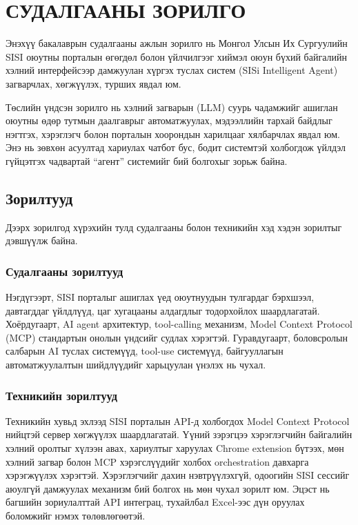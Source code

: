 \chapter{СУДАЛГААНЫ ЗОРИЛГО}

Энэхүү бакалаврын судалгааны ажлын зорилго нь Монгол Улсын Их Сургуулийн SISI оюутны порталын өгөгдөл болон үйлчилгээг хиймэл оюун бүхий байгалийн хэлний интерфейсээр дамжуулан хүргэх туслах систем (SISi Intelligent Agent) загварчлах, хөгжүүлэх, турших явдал юм.

Төслийн үндсэн зорилго нь хэлний загварын (LLM) суурь чадамжийг ашиглан оюутны өдөр тутмын даалгаврыг автоматжуулах, мэдээллийн тархай байдлыг нэгтгэх, хэрэглэгч болон порталын хоорондын харилцааг хялбарчлах явдал юм. Энэ нь зөвхөн асуултад хариулах чатбот бус, бодит системтэй холбогдож үйлдэл гүйцэтгэх чадвартай ``агент'' системийг бий болгохыг зорьж байна.

\section{Зорилтууд}

Дээрх зорилгод хүрэхийн тулд судалгааны болон техникийн хэд хэдэн зорилтыг дэвшүүлж байна.

\subsection{Судалгааны зорилтууд}

Нэгдүгээрт, SISI порталыг ашиглах үед оюутнуудын тулгардаг бэрхшээл, давтагддаг үйлдлүүд, цаг хугацааны алдагдлыг тодорхойлох шаардлагатай. Хоёрдугаарт, AI agent архитектур, tool-calling механизм, Model Context Protocol (MCP) стандартын онолын үндсийг судлах хэрэгтэй. Гуравдугаарт, боловсролын салбарын AI туслах системүүд, tool-use системүүд, байгууллагын автоматжуулалтын шийдлүүдийг харьцуулан үнэлэх нь чухал.

\subsection{Техникийн зорилтууд}

Техникийн хувьд эхлээд SISI порталын API-д холбогдох Model Context Protocol нийцтэй сервер хөгжүүлэх шаардлагатай. Үүний зэрэгцээ хэрэглэгчийн байгалийн хэлний оролтыг хүлээн авах, хариултыг харуулах Chrome extension бүтээх, мөн хэлний загвар болон MCP хэрэгслүүдийг холбох orchestration давхарга хэрэгжүүлэх хэрэгтэй. Хэрэглэгчийг дахин нэвтрүүлэхгүй, одоогийн SISI сессийг аюулгүй дамжуулах механизм бий болгох нь мөн чухал зорилт юм. Эцэст нь багшийн зориулалттай API интеграц, тухайлбал Excel-ээс дүн оруулах боломжийг нэмэх төлөвлөгөөтэй.

